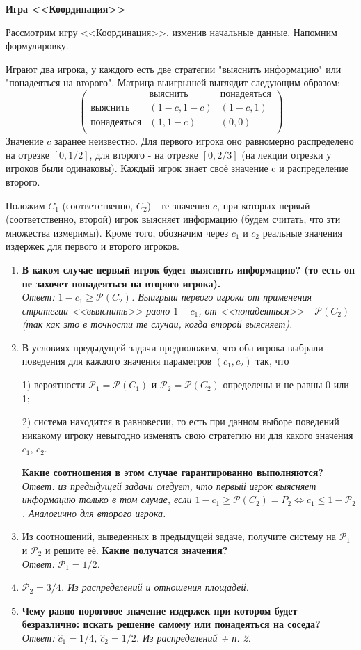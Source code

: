 \documentclass[a4paper,12pt]{article}
\newcommand{\game}[1]{\begin{center}\textbf{#1}\end{center}}
\begin{document}
\newpage
\game{Игра <<Координация>>}
Рассмотрим игру <<Координация>>, изменив начальные данные. Напомним формулировку.

Играют два игрока, у каждого есть две стратегии "выяснить информацию" или "понадеяться на второго". Матрица выигрышей выглядит следующим образом:
$$
\begin{pmatrix}
			&\text{выяснить}&\text{понадеяться}\\
	\text{выяснить}&(1-c, 1-c)& (1-c, 1)\\
	\text{понадеяться}&(1, 1-c)&(0, 0)\\
\end{pmatrix}
$$
Значение $c$ заранее неизвестно. Для первого игрока оно равномерно распределено на отрезке $[0, 1/2]$, для второго - на отрезке $[0, 2/3]$ (на лекции отрезки у игроков были одинаковы). Каждый игрок знает своё значение c и распределение второго.

Положим $C_1$ (соответственно, $C_2$) - те значения $c$, при которых первый (соответственно, второй) игрок выясняет информацию (будем считать, что эти множества измеримы). Кроме того, обозначим через $c_1$ и $c_2$ реальные значения издержек для первого и второго игроков.

\begin{enumerate}
	\item\textbf{В каком случае первый игрок будет выяснять информацию? (то есть он не захочет понадеяться на второго игрока).}\\
	\textit{Ответ: $1-c_1\geq \mathcal{P}(C_2)$. Выигрыш первого игрока от применения стратегии <<выяснить>> равно $1-c_1$, от <<понадеяться>> - $\mathcal{P}(C_2)$ (так как это в точности те случаи, когда второй выясняет).}
	\item В условиях предыдущей задачи предположим, что оба игрока выбрали поведения для каждого значения параметров $(c_1, c_2)$ так, что
	
	1) вероятности $\mathcal{P}_1=\mathcal{P}(C_1)$ и $\mathcal{P}_2=\mathcal{P}(C_2)$ определены и не равны 0 или 1;
	
	2) система находится в равновесии, то есть при данном выборе поведений никакому игроку невыгодно изменять свою стратегию ни для какого значения $c_1$, $c_2$.
	
	\textbf{Какие соотношения в этом случае гарантированно выполняются?}\\
	\textit{Ответ: из предыдущей задачи следует, что первый игрок выясняет информацию только в том случае, если $1-c_1\geq \mathcal{P}(C_2)=P_2\Leftrightarrow c_1\leq 1-\mathcal{P}_2$. Аналогично для второго игрока.}
	\item Из соотношений, выведенных в предыдущей задаче, получите систему на $\mathcal{P}_1$ и $\mathcal{P}_2$ и решите её. \textbf{Какие получатся значения?}\\
	\textit{Ответ: $\mathcal{P}_1 = 1/2$.}
	\item \textit{$\mathcal{P}_2 = 3/4$. Из распределений и отношения площадей.}
	\item \textbf{Чему равно пороговое значение издержек при котором будет безразлично: искать решение самому или понадеяться на соседа?}\\
	\textit{Ответ: $\hat{c}_1 = 1/4$, $\hat{c}_2 = 1/2$. Из распределений + п. 2.}
\end{enumerate}
\end{document}
